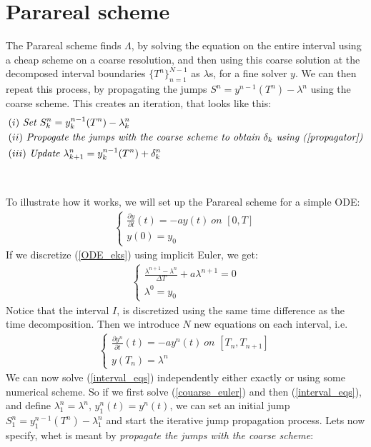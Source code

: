 \section{Parareal scheme}
The Parareal scheme finds $\Lambda$, by solving the equation on the entire interval using a cheap scheme on a coarse resolution, and then using this coarse solution at the decomposed interval boundaries $\{T^n\}_{n=1}^{N-1}$ as $\lambda$s, for a fine solver $y$. We can then repeat this process, by propagating the jumps $S^n=y^{n-1}(T^n)-\lambda^n$ using the coarse scheme. This creates an iteration, that looks like this:
\begin{align*}
&(i) \ \textit{Set $S^n_k = y_k^{n-1}(T^n)-\lambda_k^n$} \\
&(ii) \ \textit{Propogate the jumps with the coarse scheme to obtain $\delta_k$ using (\ref{propagator})} \\
&(iii) \ \textit{Update $\lambda_{k+1}^n=y_k^{n-1}(T^n) + \delta_k^n$}
\end{align*} 
\\
\\
To illustrate how it works, we will set up the Parareal scheme for a simple ODE:
\begin{align}
\left\{
     \begin{array}{lr}
		\frac{\partial y}{\partial t}(t)=-ay(t) \ 				\textit{on $[0,T]$} \\
		y(0)=y_0
	\end{array}
\right.	\label{ODE_eks}
\end{align}
If we discretize (\ref{ODE_eks}) using implicit Euler, we get:
\begin{align}
\left\{
     \begin{array}{lr}
		\frac{\lambda^{n+1}-\lambda^{n}}{\Delta T}+a\lambda^{n+1}=0  \\
		\lambda^0=y_0
	\end{array}
\right.	\label{couarse_euler}
\end{align}
Notice that the interval $I$, is discretized using the same time difference as the time decomposition. Then we introduce $N$ new equations on each interval, i.e.
\begin{align}
\left\{
     \begin{array}{lr}
		\frac{\partial y^n}{\partial t}(t)=-ay^n(t) \ 				\textit{on $[T_n,T_{n+1}]$} \\
		y(T_n)=\lambda^n
	\end{array}
\right. \label{interval_eqs}
\end{align}
We can now solve (\ref{interval_eqs}) independently either exactly or using some numerical scheme. So if we first solve (\ref{couarse_euler}) and then (\ref{interval_eqs}), and define $\lambda_1^n=\lambda^n$, $y_1^n(t)=y^n(t)$, we can set an initial jump $S_1^n=y_1^{n-1}(T^n)-\lambda_1^n$ and start the iterative jump propagation process. Lets now specify, whet is meant by \textit{propagate the jumps with the coarse scheme}:
